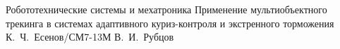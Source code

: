 \documentclass{bmstu}
\begin{document}
                {Робототехнические системы и мехатроника}                       %
                {Применение мультиобъектного трекинга в системах адаптивного куриз-контроля и экстренного торможения}                                                              %
                {К.~Ч.~Есенов/СМ7-13М}                                          %
                {В.~И.~Рубцов}                                                 %
                {}                                                              %
\end{document}
